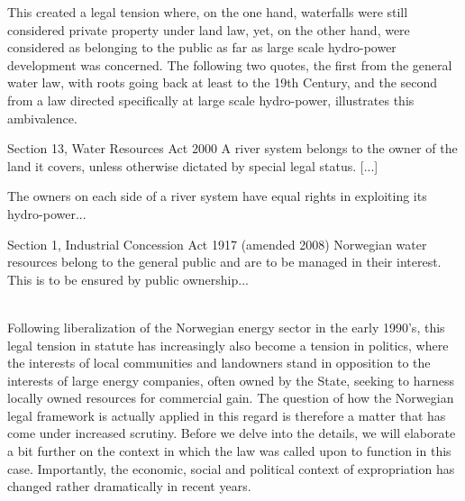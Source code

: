 This created a legal tension where, on the one hand, waterfalls were still considered private property under land law, yet, on the other hand, were considered as belonging to the public as far as large scale hydro-power development was concerned. The following two quotes, the first from the general water law, with roots going back at least to the 19th Century, and the second  from a law directed specifically at large scale hydro-power, illustrates this ambivalence.

{\begin{minipage}[t]{16em}
 \begin{aquote}{\tiny Section 13, Water Resources Act 2000} \footnotesize A river system belongs to the owner of the land it covers, unless otherwise dictated by special legal status. [...]

The owners on each side of a river system have equal rights in exploiting its hydro-power...
\end{aquote}  
\end{minipage}}
{\begin{minipage}[t]{22em}
\begin{aquote}{\tiny Section 1, Industrial Concession Act 1917 (amended 2008)} \footnotesize Norwegian water resources belong to the general public and are to be managed in their interest. This is to be ensured by public ownership...
\end{aquote}
\end{minipage}} \\

Following liberalization of the Norwegian energy sector in the early 1990's, this legal tension in statute has increasingly also become a tension in politics, where the interests of local communities and landowners stand in opposition to the interests of large energy companies, often owned by the State, seeking to harness locally owned resources for commercial gain. The question of how the Norwegian legal framework is actually applied in this regard is therefore a matter that has come under increased scrutiny. Before we delve into the details, we will elaborate a bit further on the context in which the law was called upon to function in this case. Importantly, the economic, social and political context of expropriation has changed rather dramatically in recent years.

